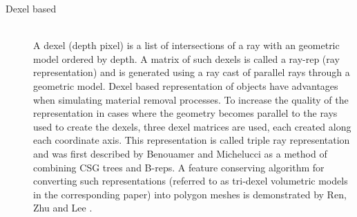 \begin{description}
\item[Dexel based] \hfill \\
A dexel (depth pixel) is a list of intersections of a ray with an geometric model ordered by depth. A matrix of such dexels is called a ray-rep (ray representation) and is generated using a ray cast of parallel rays through a geometric model. Dexel based representation of objects have advantages when simulating material removal processes. To increase the quality of the representation in cases where the geometry becomes parallel to the rays used to create the dexels, three dexel matrices are used, each created along each coordinate axis. This representation is called triple ray representation and was first described by Benouamer and Michelucci \cite{tridexel_intersection} as a method of combining CSG trees and B-reps. A feature conserving algorithm for converting such representations (referred to as tri-dexel volumetric models in the corresponding paper) into polygon meshes is demonstrated by Ren, Zhu and Lee \cite{tridexel_reconstruction}.

\end{description}
